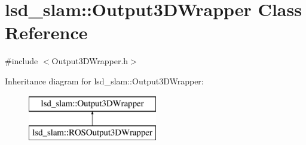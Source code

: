 \hypertarget{classlsd__slam_1_1_output3_d_wrapper}{\section{lsd\-\_\-slam\-:\-:Output3\-D\-Wrapper Class Reference}
\label{classlsd__slam_1_1_output3_d_wrapper}
}


{\ttfamily \#include $<$Output3\-D\-Wrapper.\-h$>$}

Inheritance diagram for lsd\-\_\-slam\-:\-:Output3\-D\-Wrapper\-:\begin{figure}[H]
\begin{center}
\leavevmode
\includegraphics[height=2.000000cm]{classlsd__slam_1_1_output3_d_wrapper}
\end{center}
\end{figure}
